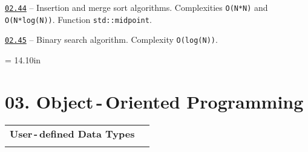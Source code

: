 \documentclass[a4paper,12pt]{article}
\renewenvironment{itemize}
{
    \begin{list}{\labelitemi}
    {
      \setlength{\topsep}{0pt}
      \setlength{\partopsep}{0pt}
      \setlength{\parskip}{0pt}
      \setlength{\itemsep}{0pt}
      \setlength{\parsep}{0pt}
      \setlength{\leftmargin}{14.5pt}
    }
}{\end{list}}
\begin{document}
\begin{itemize}
    \smallskip

    \item \href{https://github.com/i-s-m-mipt/Education/blob/master/projects/examples/source/02.44.cpp}{\texttt{02.44}} -- Insertion and merge sort algorithms. Complexities \texttt{O(N*N)} and \texttt{O(N*log(N))}. Function \lstinline{std::midpoint}.

    \smallskip

    \item \href{https://github.com/i-s-m-mipt/Education/blob/master/projects/examples/source/02.45.cpp}{\texttt{02.45}} -- Binary search algorithm. Complexity \texttt{O(log(N))}.

\end{itemize}



\newpage\thispagestyle{empty}\pdfpageheight = 14.10in\enlargethispage{100in}

\section{03. Object\,-\,Oriented Programming}

\begin{tabular}{!{\vrule width 1pt}L{5.1cm}!{\vrule width 1pt}L{13.9cm}!{\vrule width 0pt}} 


\textbf{User\,-\,defined Data Types} & \\


\end{tabular}

\medskip\smallskip
\end{document}
